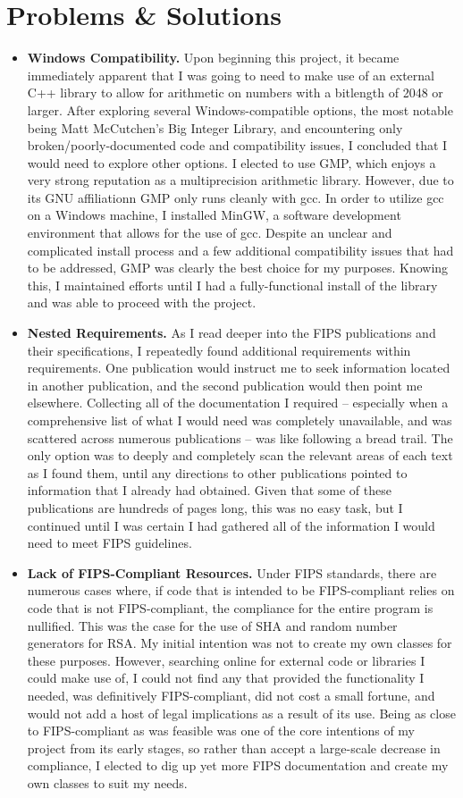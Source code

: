 \documentclass[11pt]{article}
\begin{document}
\section{Problems \& Solutions}
\begin{itemize}
\item
{
\textbf{Windows Compatibility.} Upon beginning this project, it became immediately apparent that I was going to need to make use of an external C++ library to allow for arithmetic on numbers with a bitlength of 2048 or larger. After exploring several Windows-compatible options, the most notable being Matt McCutchen's Big Integer Library, and encountering only broken/poorly-documented code and compatibility issues, I concluded that I would need to explore other options. I elected to use GMP, which enjoys a very strong reputation as a multiprecision arithmetic library. However, due to its GNU affiliationn GMP only runs cleanly with gcc. In order to utilize gcc on a Windows machine, I installed MinGW, a software development environment that allows for the use of gcc. Despite an unclear and complicated install process and a few additional compatibility issues that had to be addressed, GMP was clearly the best choice for my purposes. Knowing this, I maintained efforts until I had a fully-functional install of the library and was able to proceed with the project.
}
\item
{
\textbf{Nested Requirements.} As I read deeper into the FIPS publications and their specifications, I repeatedly found additional requirements within requirements. One publication would instruct me to seek information located in another publication, and the second publication would then point me elsewhere. Collecting all of the documentation I required -- especially when a comprehensive list of what I would need was completely unavailable, and was scattered across numerous publications -- was like following a bread trail. The only option was to deeply and completely scan the relevant areas of each text as I found them, until any directions to other publications pointed to information that I already had obtained. Given that some of these publications are hundreds of pages long, this was no easy task, but I continued until I was certain I had gathered all of the information I would need to meet FIPS guidelines. 
}
\item
{
\textbf{Lack of FIPS-Compliant Resources.} Under FIPS standards, there are numerous cases where, if code that is intended to be FIPS-compliant relies on code that is not FIPS-compliant, the compliance for the entire program is nullified. This was the case for the use of SHA and random number generators for RSA. My initial intention was not to create my own classes for these purposes. However, searching online for external code or libraries I could make use of, I could not find any that provided the functionality I needed, was definitively FIPS-compliant, did not cost a small fortune, and would not add a host of legal implications as a result of its use. Being as close to FIPS-compliant as was feasible was one of the core intentions of my project from its early stages, so rather than accept a large-scale decrease in compliance, I elected to dig up yet more FIPS documentation and create my own classes to suit my needs.
}
\end{itemize}
\end{document}

